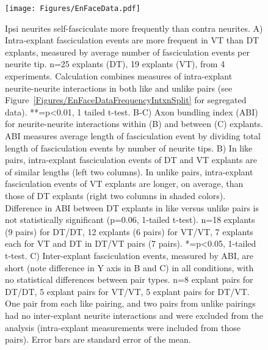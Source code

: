 \begin{figure}[hbtp]
    \begin{center}
        \texttt{[image: Figures/EnFaceData.pdf]}
        \caption[Ipsi neurites self-fasciculate more frequently than contra neurites.]
        {Ipsi neurites self-fasciculate more frequently than contra neurites.
        A) Intra-explant fasciculation events are more frequent in VT than DT explants, measured by average number of fasciculation events per neurite tip.
        n=25 explants (DT), 19 explants (VT), from 4 experiments.
        Calculation combines measures of intra-explant neurite-neurite interactions in both like and unlike pairs (see Figure~\ref{Figures/EnFaceDataFrequencyIntxnSplit} for segregated data).
        **=p<0.01, 1 tailed t-test.
        B-C) Axon bundling index (ABI) for neurite-neurite interactions within (B) and between (C) explants.
        ABI measures average length of fasciculation event by dividing total length of fasciculation events by number of neurite tips.
        B) In like pairs, intra-explant fasciculation events of DT and VT explants are of similar lengths (left two columns).
        In unlike pairs, intra-explant fasciculation events of VT explants are longer, on average, than those of DT explants (right two columns in shaded colors).
        Difference in ABI between DT explants in like versus unlike pairs is not statistically significant (p=0.06, 1-tailed t-test).
        n=18 explants (9 pairs) for DT/DT, 12 explants (6 pairs) for VT/VT, 7 explants each for VT and DT in DT/VT pairs (7 pairs).
        *=p<0.05, 1-tailed t-test.
        C) Inter-explant fasciculation events, measured by ABI, are short (note difference in Y axis in B and C) in all conditions, with no statistical differences between pair types.
        n=8 explant pairs for DT/DT, 5 explant pairs for VT/VT, 5 explant pairs for DT/VT.
        One pair from each like pairing, and two pairs from unlike pairings had no inter-explant neurite interactions and were excluded from the analysis (intra-explant measurements were included from those pairs).
        Error bars are standard error of the mean.
        }
        \label{Figures/EnFaceData}
    \end{center}
\end{figure}


